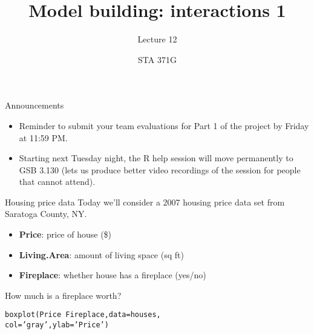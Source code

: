 \documentclass{beamer}\usepackage[]{graphicx}\usepackage[]{color}
\title{Model building: interactions 1}
\subtitle{Lecture 12}
\author{STA 371G}
\makeatletter
\newcommand{\hlstr}[1]{\textcolor[rgb]{1,0.894,0.71}{#1}}%
\newcommand{\hlopt}[1]{\textcolor[rgb]{1,0.894,0.769}{#1}}%
\newcommand{\hlstd}[1]{\textcolor[rgb]{1,0.894,0.769}{#1}}%
\newcommand{\hlkwc}[1]{\textcolor[rgb]{0.78,0.941,0.545}{#1}}%
\newcommand{\hlkwd}[1]{\textcolor[rgb]{1,0.78,0.769}{#1}}%
\newenvironment{kframe}{%
 \def\at@end@of@kframe{}%
 \ifinner\ifhmode%
  \def\at@end@of@kframe{\end{minipage}}%
  \begin{minipage}{\columnwidth}%
 \fi\fi%
 \def\FrameCommand##1{\hskip\@totalleftmargin \hskip-\fboxsep
 \colorbox{shadecolor}{##1}\hskip-\fboxsep
     \hskip-\linewidth \hskip-\@totalleftmargin \hskip\columnwidth}%
 \MakeFramed {\advance\hsize-\width
   \@totalleftmargin\z@ \linewidth\hsize
   \@setminipage}}%
 {\par\unskip\endMakeFramed%
 \at@end@of@kframe}
\newenvironment{knitrout}{}{} %
\makeatother
\begin{document}
  
  

\frame{\maketitle}



  \begin{darkframes}
    \begin{frame}{Announcements}
      \begin{itemize}
        \item Reminder to submit your team evaluations for Part 1 of the project by Friday at 11:59 PM.
        \item Starting next Tuesday night, the R help session will move permanently to GSB 3.130 (lets us produce better video recordings of the session for people that cannot attend).
      \end{itemize}
    \end{frame}

    \begin{frame}{Housing price data}
      Today we'll consider a 2007 housing price data set from Saratoga County, NY.
      \begin{itemize}
        \item \textbf{Price}: price of house (\$)
        \item \textbf{Living.Area}: amount of living space (sq ft)
        \item \textbf{Fireplace}: whether house has a fireplace (yes/no)
      \end{itemize}

    \end{frame}

    \begin{frame}[fragile]{How much is a fireplace worth?}
\begin{knitrout}
\begin{kframe}
\begin{alltt}
\hlkwd{boxplot}\hlstd{(Price} \hlopt{~} \hlstd{Fireplace,} \hlkwc{data}\hlstd{=houses,}
  \hlkwc{col}\hlstd{=}\hlstr{'gray'}\hlstd{,} \hlkwc{ylab}\hlstd{=}\hlstr{'Price'}\hlstd{)}
\end{alltt}
\end{kframe}



\end{knitrout}
\end{frame}
\end{darkframes}
\end{document}
